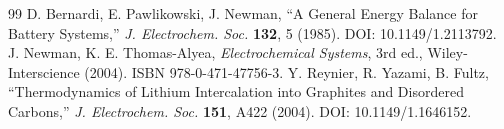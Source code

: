 \documentclass[11pt,a4paper]{article}
\begin{document}
\begin{thebibliography}{99}
 D. Bernardi, E. Pawlikowski, J. Newman, ``A General Energy Balance for Battery Systems,'' \emph{J. Electrochem. Soc.} \textbf{132}, 5 (1985). DOI: 10.1149/1.2113792.
 J. Newman, K. E. Thomas-Alyea, \emph{Electrochemical Systems}, 3rd ed., Wiley-Interscience (2004). ISBN 978-0-471-47756-3.
 Y. Reynier, R. Yazami, B. Fultz, ``Thermodynamics of Lithium Intercalation into Graphites and Disordered Carbons,'' \emph{J. Electrochem. Soc.} \textbf{151}, A422 (2004). DOI: 10.1149/1.1646152.
\end{thebibliography}
\end{document}
